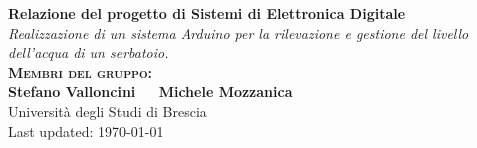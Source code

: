 \documentclass[12pt]{article}
\begin{document}
\begin{titlepage}
	\begin{center}
		{\huge\bfseries Relazione del progetto di Sistemi di Elettronica Digitale\\}
	    \vspace{1cm}
	    {\Large \textit{Realizzazione di un sistema Arduino per la rilevazione e gestione del livello dell'acqua di un serbatoio.} \\}
		\vspace{2cm}
		{\Large \bfseries\scshape Membri del gruppo:} \\ 
		\vspace{.5cm}
		{\Large\bfseries Stefano Valloncini} $\quad$
		{\Large\bfseries Michele Mozzanica} \\
        \vspace{2.5cm}
        {\Large }
		\vfill
		{Università degli Studi di Brescia}\\[10pt]
		{Last updated: \today}
	\end{center}
\end{titlepage}



\setlength{\headheight}{13.59999pt}
\pagestyle{fancy}

\tableofcontents
\newpage
{}

\end{document}
